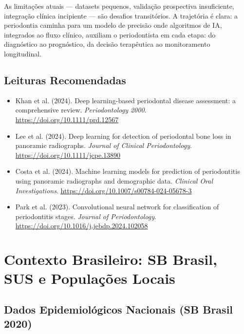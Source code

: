 As limitações atuais --- datasets pequenos, validação prospectiva insuficiente, integração clínica incipiente --- são desafios transitórios. A trajetória é clara: a periodontia caminha para um modelo de precisão onde algoritmos de IA, integrados ao fluxo clínico, auxiliam o periodontista em cada etapa: do diagnóstico ao prognóstico, da decisão terapêutica ao monitoramento longitudinal.

\subsection*{Leituras Recomendadas}
\begin{itemize}
    \item Khan et al. (2024). Deep learning-based periodontal disease assessment: a comprehensive review. \textit{Periodontology 2000}. \url{https://doi.org/10.1111/prd.12567}
    \item Lee et al. (2024). Deep learning for detection of periodontal bone loss in panoramic radiographs. \textit{Journal of Clinical Periodontology}. \url{https://doi.org/10.1111/jcpe.13890}
    \item Costa et al. (2024). Machine learning models for prediction of periodontitis using panoramic radiographs and demographic data. \textit{Clinical Oral Investigations}. \url{https://doi.org/10.1007/s00784-024-05678-3}
    \item Park et al. (2023). Convolutional neural network for classification of periodontitis stages. \textit{Journal of Periodontology}. \url{https://doi.org/10.1016/j.jebdp.2024.102058}
\end{itemize}



\section{Contexto Brasileiro: SB Brasil, SUS e Populações Locais}


\subsection*{Dados Epidemiológicos Nacionais (SB Brasil 2020)}

